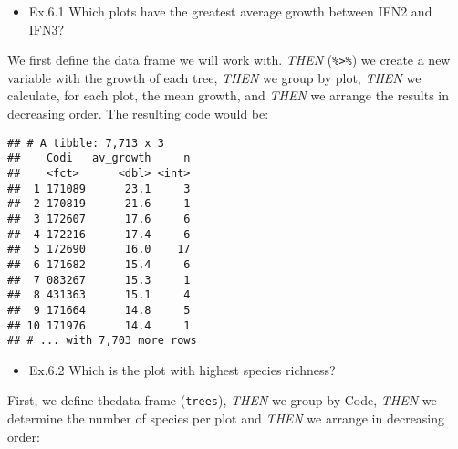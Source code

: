 \documentclass[]{article}
\newenvironment{Shaded}{\begin{snugshade}}{\end{snugshade}}
\newcommand{\KeywordTok}[1]{\textcolor[rgb]{0.13,0.29,0.53}{\textbf{#1}}}
\newcommand{\DataTypeTok}[1]{\textcolor[rgb]{0.13,0.29,0.53}{#1}}
\newcommand{\StringTok}[1]{\textcolor[rgb]{0.31,0.60,0.02}{#1}}
\newcommand{\OperatorTok}[1]{\textcolor[rgb]{0.81,0.36,0.00}{\textbf{#1}}}
\newcommand{\NormalTok}[1]{#1}
\providecommand{\tightlist}{%
  \setlength{\itemsep}{0pt}\setlength{\parskip}{0pt}}
\begin{document}
\begin{itemize}
\tightlist
\item
  Ex.6.1 Which plots have the greatest average growth between IFN2 and
  IFN3?
\end{itemize}

We first define the data frame we will work with. \emph{THEN}
(\texttt{\%\textgreater{}\%}) we create a new variable with the growth
of each tree, \emph{THEN} we group by plot, \emph{THEN} we calculate,
for each plot, the mean growth, and \emph{THEN} we arrange the results
in decreasing order. The resulting code would be:

\begin{Shaded}
\end{Shaded}

\begin{verbatim}
## # A tibble: 7,713 x 3
##    Codi   av_growth     n
##    <fct>      <dbl> <int>
##  1 171089      23.1     3
##  2 170819      21.6     1
##  3 172607      17.6     6
##  4 172216      17.4     6
##  5 172690      16.0    17
##  6 171682      15.4     6
##  7 083267      15.3     1
##  8 431363      15.1     4
##  9 171664      14.8     5
## 10 171976      14.4     1
## # ... with 7,703 more rows
\end{verbatim}

\begin{itemize}
\tightlist
\item
  Ex.6.2 Which is the plot with highest species richness?
\end{itemize}

First, we define thedata frame (\texttt{trees}), \emph{THEN} we group by
Code, \emph{THEN} we determine the number of species per plot and
\emph{THEN} we arrange in decreasing order:

\begin{Shaded}
\end{Shaded}
\end{document}
